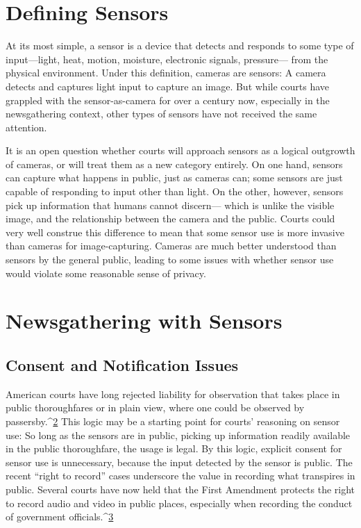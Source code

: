 \section{Defining Sensors}
At its most simple, a sensor is a device that detects and responds to some
type of input—light, heat, motion, moisture, electronic signals, pressure—
from the physical environment. Under this definition, cameras are sensors:
A camera detects and captures light input to capture an image. But while
courts have grappled with the sensor-as-camera for over a century now,
especially in the newsgathering context, other types of sensors have not
received the same attention.

It is an open question whether courts will approach sensors as a logical
outgrowth of cameras, or will treat them as a new category entirely. On
one hand, sensors can capture what happens in public, just as cameras can;
some sensors are just capable of responding to input other than light. On
the other, however, sensors pick up information that humans cannot discern—
which is unlike the visible image, and the relationship between the
camera and the public. Courts could very well construe this difference to
mean that some sensor use is more invasive than cameras for image-capturing.
Cameras are much better understood than sensors by the general
public, leading to some issues with whether sensor use would violate some
reasonable sense of privacy.

\section{Newsgathering with Sensors}
\subsection{Consent and Notification Issues}

American courts have long rejected liability for observation that takes place
in public thoroughfares or in plain view, where one could be observed by
passersby.^{\href{#endnotes-syed}{2}} This logic may be a starting point for courts' reasoning on sensor
use: So long as the sensors are in public, picking up information readily
available in the public thoroughfare, the usage is legal. By this logic, explicit
consent for sensor use is unnecessary, because the input detected by the
sensor is public. The recent ``right to record'' cases underscore the value in
recording what transpires in public. Several courts have now held that the
First Amendment protects the right to record audio and video in public
places, especially when recording the conduct of government officials.^{\href{#endnotes-syed}{3}}

